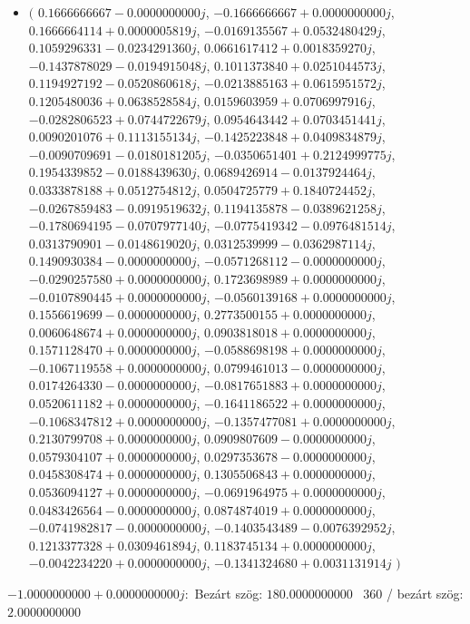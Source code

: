 \documentclass[14pt,a4paper]{article}
\begin{document}
\begin{itemize}
\item
$\big($
$0.1666666667-0.0000000000j$, $-0.1666666667+0.0000000000j$, $0.1666664114+0.0000005819j$, $-0.0169135567+0.0532480429j$, $0.1059296331-0.0234291360j$, $0.0661617412+0.0018359270j$, $-0.1437878029-0.0194915048j$, $0.1011373840+0.0251044573j$, $0.1194927192-0.0520860618j$, $-0.0213885163+0.0615951572j$, $0.1205480036+0.0638528584j$, $0.0159603959+0.0706997916j$, $-0.0282806523+0.0744722679j$, $0.0954643442+0.0703451441j$, $0.0090201076+0.1113155134j$, $-0.1425223848+0.0409834879j$, $-0.0090709691-0.0180181205j$, $-0.0350651401+0.2124999775j$, $0.1954339852-0.0188439630j$, $0.0689426914-0.0137924464j$, $0.0333878188+0.0512754812j$, $0.0504725779+0.1840724452j$, $-0.0267859483-0.0919519632j$, $0.1194135878-0.0389621258j$, $-0.1780694195-0.0707977140j$, $-0.0775419342-0.0976481514j$, $0.0313790901-0.0148619020j$, $0.0312539999-0.0362987114j$, $0.1490930384-0.0000000000j$, $-0.0571268112-0.0000000000j$, $-0.0290257580+0.0000000000j$, $0.1723698989+0.0000000000j$, $-0.0107890445+0.0000000000j$, $-0.0560139168+0.0000000000j$, $0.1556619699-0.0000000000j$, $0.2773500155+0.0000000000j$, $0.0060648674+0.0000000000j$, $0.0903818018+0.0000000000j$, $0.1571128470+0.0000000000j$, $-0.0588698198+0.0000000000j$, $-0.1067119558+0.0000000000j$, $0.0799461013-0.0000000000j$, $0.0174264330-0.0000000000j$, $-0.0817651883+0.0000000000j$, $0.0520611182+0.0000000000j$, $-0.1641186522+0.0000000000j$, $-0.1068347812+0.0000000000j$, $-0.1357477081+0.0000000000j$, $0.2130799708+0.0000000000j$, $0.0909807609-0.0000000000j$, $0.0579304107+0.0000000000j$, $0.0297353678-0.0000000000j$, $0.0458308474+0.0000000000j$, $0.1305506843+0.0000000000j$, $0.0536094127+0.0000000000j$, $-0.0691964975+0.0000000000j$, $0.0483426564-0.0000000000j$, $0.0874874019+0.0000000000j$, $-0.0741982817-0.0000000000j$, $-0.1403543489-0.0076392952j$, $0.1213377328+0.0309461894j$, $0.1183745134+0.0000000000j$, $-0.0042234220+0.0000000000j$, $-0.1341324680+0.0031131914j$
$\big)$
\end{itemize}
$-1.0000000000+0.0000000000j$:\
Bezárt szög: $180.0000000000$ \
360 / bezárt szög: $2.0000000000$\
\end{document}
